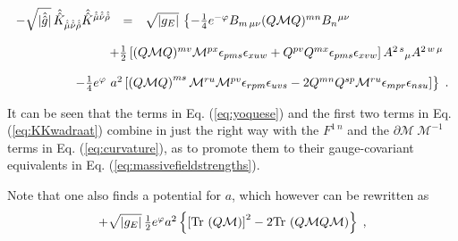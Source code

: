 \documentclass[12pt,a4paper]{article}
\begin{document}
\begin{equation}
 \label{eq:KKwadraat}
\begin{array}{rcl}
-\sqrt{|\hat{\hat{g}}|}\, 
\hat{\hat{K}}_{\hat{\hat{\mu}}\hat{\hat{\nu}}\hat{\hat{\rho}}}
\hat{\hat{K}}{}^{\hat{\hat{\mu}}\hat{\hat{\nu}}\hat{\hat{\rho}}}
& = & 
\sqrt{|g_{E}|}\, \left\{
  -\textstyle{\frac{1}{4}}e^{-\varphi} 
 B_{m\, \mu\nu}(Q\mathcal{M}Q)^{mn} B_{n}{}^{\mu\nu} 
\right. \\
& & \\
& & 
\hspace{-1cm}
+\textstyle{\frac{1}{2}}
     \left[
       (Q\mathcal{M}Q)^{mv}\mathcal{M}^{px}\epsilon_{pms}\epsilon_{xuw}
       + Q^{pv}Q^{mx}\epsilon_{pms}\epsilon_{xvw}
     \right] A^{2\, s}{}_{\mu}A^{2\,w\, \mu} \\
& & \\
& & 
\hspace{-2cm}
\left.
       -\textstyle{\frac{1}{4}}e^{\varphi}\ a^2
         \left[
            \left( Q\mathcal{M}Q\right)^{ms}\mathcal{M}^{ru}\mathcal{M}^{pv}
               \epsilon_{rpm}\epsilon_{uvs}
            -2Q^{mn}Q^{sp}\mathcal{M}^{ru}\epsilon_{mpr}\epsilon_{nsu}
         \right]
    \right\} \; .\\
\end{array}
\end{equation}

It can be seen that the terms in Eq. (\ref{eq:yoquese}) and the first
two terms in Eq. (\ref{eq:KKwadraat}) combine in just the right way
with the $F^{1\ n}$ and the $\partial\mathcal{M}\ \mathcal{M}^{-1}$
terms in Eq. (\ref{eq:curvature}), as to promote them to their
gauge-covariant equivalents in Eq. (\ref{eq:massivefieldstrengths}).

Note that one also finds a potential for $a$, which
however can be rewritten as
%
\begin{equation}
+\sqrt{|g_{E}|}\, \textstyle{\frac{1}{2}} e^{\varphi}a^{2}
\left\{\left[{\rm Tr}\, \left( Q\mathcal{M}\right)\right]^{2}
-2{\rm Tr}\, \left( Q\mathcal{M}Q\mathcal{M} \right)
\right\} \; ,
\label{eq:Potential2}
\end{equation}
\end{document}
